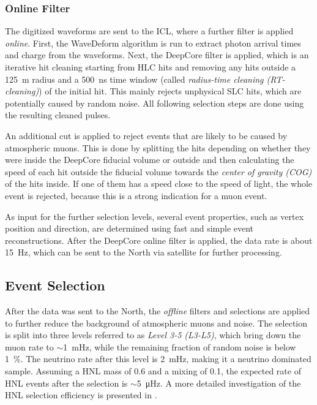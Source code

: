 \subsubsection{Online Filter} 

The digitized waveforms are sent to the ICL, where a further filter is applied \textit{online}. First, the WaveDeform algorithm is run to extract photon arrival times and charge from the waveforms. Next, the DeepCore filter is applied, which is an iterative hit cleaning starting from HLC hits and removing any hits outside a \SI{125}{\meter} radius and a \SI{500}{\nano\second} time window (called \textit{radius-time cleaning (RT-cleaning)}) of the initial hit. This mainly rejects unphysical SLC hits, which are potentially caused by random noise. All following selection steps are done using the resulting cleaned pulses.

An additional cut is applied to reject events that are likely to be caused by atmospheric muons. This is done by splitting the hits depending on whether they were inside the DeepCore fiducial volume or outside and then calculating the speed of each hit outside the fiducial volume towards the \textit{center of gravity (COG)} of the hits inside. If one of them has a speed close to the speed of light, the whole event is rejected, because this is a strong indication for a muon event.

As input for the further selection levels, several event properties, such as vertex position and direction, are determined using fast and simple event reconstructions. After the DeepCore online filter is applied, the data rate is about \SI{15}{\hertz}, which can be sent to the North via satellite for further processing.


\subsection{Event Selection} 

After the data was sent to the North, the \textit{offline} filters and selections are applied to further reduce the background of atmospheric muons and noise. The selection is split into three levels referred to as \textit{Level 3-5 (L3-L5)}, which bring down the muon rate to $\sim$\SI{1}{\milli\hertz}, while the remaining fraction of random noise is below \SI{1}{\percent}. The neutrino rate after this level is \SI{2}{\milli\hertz}, making it a neutrino dominated sample. Assuming a HNL mass of \SI{0.6}{\gev} and a mixing of 0.1, the expected rate of HNL events after the selection is $\sim$\SI{5}{\micro\hertz}. A more detailed investigation of the HNL selection efficiency is presented in .


